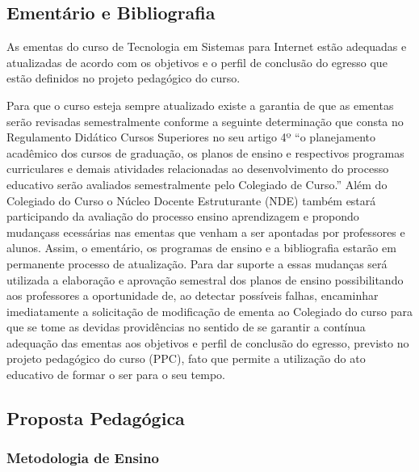 

\subsection{Ementário e Bibliografia}

	As ementas do curso de Tecnologia em Sistemas para Internet estão adequadas e atualizadas de acordo com os objetivos e o perfil de conclusão do egresso que estão definidos no projeto pedagógico do curso. 
			
			Para que o curso esteja sempre atualizado existe a garantia de que as ementas serão revisadas semestralmente conforme a seguinte determinação que consta no Regulamento Didático Cursos Superiores no seu artigo 4º “o planejamento acadêmico dos cursos de graduação, os planos de ensino e respectivos programas curriculares e demais atividades relacionadas ao desenvolvimento do processo educativo serão avaliados semestralmente pelo Colegiado de Curso.” Além do Colegiado do Curso o Núcleo Docente Estruturante (NDE) também estará participando da avaliação do processo ensino aprendizagem e propondo mudançass ecessárias nas ementas que venham a ser apontadas por professores e alunos. Assim, o ementário, os programas de ensino e a bibliografia estarão em permanente processo de atualização. Para dar suporte a essas mudanças será utilizada a elaboração e aprovação semestral dos planos de ensino possibilitando aos professores a oportunidade de, ao detectar possíveis falhas, encaminhar imediatamente a solicitação de modificação de ementa ao Colegiado do curso para que se tome as devidas providências no sentido de se garantir a contínua adequação das ementas aos objetivos e perfil de conclusão do egresso, previsto no projeto pedagógico do curso (PPC), fato que permite a utilização do ato educativo de formar o ser para o seu tempo.



\subsection{Proposta Pedag\'ogica}

\subsubsection{Metodologia de Ensino}

